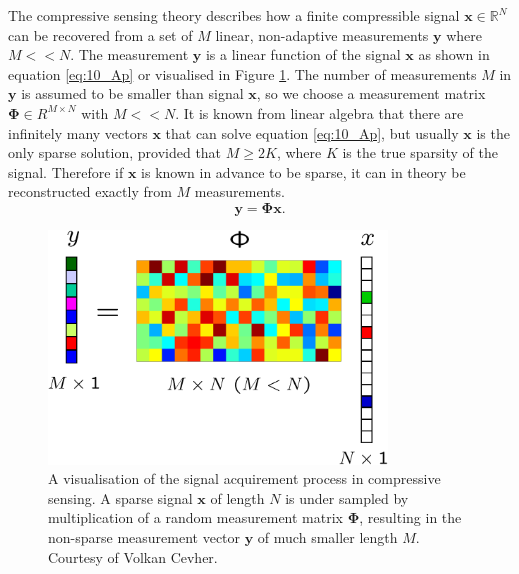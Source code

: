 


The compressive sensing theory describes how a finite compressible signal $\boldsymbol{x} \in \mathbb{R}^N$ can be recovered from a set of $M$ linear, non-adaptive measurements $\boldsymbol{y}$ where $M < < N$. The measurement $\boldsymbol{y}$ is a linear function of the signal $\boldsymbol{x}$ as shown in equation \eqref{eq:10_Ap} or visualised in Figure \ref{fig:csVC}. The number of measurements $M$ in $\boldsymbol{y}$ is assumed to be smaller than signal $\boldsymbol{x}$, so we choose a measurement matrix $\boldsymbol{\Phi} \in R^{M \times N}$ with $M < < N$. It is known from linear algebra that there are infinitely many vectors $\boldsymbol{x}$ that can solve equation \eqref{eq:10_Ap}, but usually $\boldsymbol{x}$ is the only sparse solution, provided that $M \geq 2K$, where $K$ is the true sparsity of the signal. Therefore if $\boldsymbol{x}$ is known in advance to be sparse, it can in theory be reconstructed exactly from $M$ measurements.
%
\begin{equation}
  \label{eq:10_Ap}
\boldsymbol{y} =\boldsymbol{\Phi x}.
\end{equation}
%


\begin{figure}[h]
  \centering
  \includegraphics[width = 9cm]{csss.png}
\caption{A visualisation of the signal acquirement process in compressive sensing. A sparse signal $\boldsymbol{x}$ of length $N$ is under sampled by multiplication of a random measurement matrix $\boldsymbol{\Phi}$, resulting in the non-sparse measurement vector $\boldsymbol{y}$ of much smaller length $M$. Courtesy of Volkan Cevher.}
\label{fig:csVC}
\end{figure}

